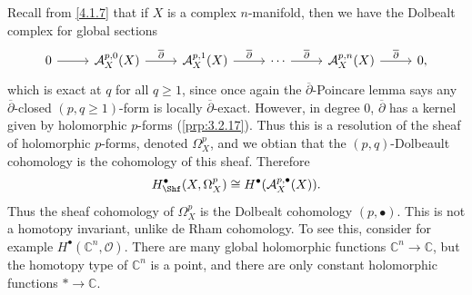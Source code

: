 \begin{example}
	Recall from \cref{4.1.7} that if $X$ is a complex $n$-manifold, then we have the Dolbealt complex for global sections
	\[\begin{tikzcd}[row sep = 2.5em, column sep = 2.5em]
	0\ar[r]  & \mathcal{A} _X^{p,0}(X) \ar[" \overline{\partial }  ", r]  & \mathcal{A} _X^{p,1}(X) \ar[" \overline{\partial }  ", r]  & \cdots \ar[" \overline{\partial }  ", r]  & \mathcal{A} ^{p,n}_X(X) \ar[" \overline{\partial }  ", r]  & 0,
	\end{tikzcd}\]
	which is exact at $q$ for all $q\geq 1$, since once again the $\overline{\partial } $-Poincare lemma says any $\overline{\partial } $-closed $(p,q \geq 1)$-form is locally $\overline{\partial } $-exact. However, in degree 0, $\overline{\partial } $ has a kernel given by holomorphic $p$-forms (\cref{prp:3.2.17}). Thus this is a resolution of the sheaf of holomorphic $p$-forms, denoted $\Omega _X^p$, and we obtian that the $(p,q)$-Dolbeault cohomology is the cohomology of this sheaf. Therefore
	\[
		H^{\bullet}_{\Shf }(X,\Omega _X^p) \cong H^{\bullet} (\mathcal{A}_X^{p,\bullet} (X))
	.\]
	Thus the sheaf cohomology of $\Omega _X^p$ is the Dolbealt cohomology $(p,\bullet)$. This is not a homotopy invariant, unlike de Rham cohomology. To see this, consider for example $H^{\bullet} (\mathbb{C} ^n, \mathcal{O} )$. There are many global holomorphic functions $\mathbb{C} ^n\to \mathbb{C} $, but the homotopy type of $\mathbb{C} ^n$ is a point, and there are only constant holomorphic functions $*\to \mathbb{C} $.
\end{example}

